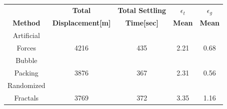 \begin{center}
 \label{perf_multiple} 
\begin{tabular}{|c|c|c|c|c|}
					
\hline
\textbf{} & \textbf{Total}  & \textbf{Total Settling} & \textbf{$\epsilon_t$} & \textbf{$\epsilon_g$} \\ \textbf{Method} & \textbf{Displacement[m]} & \textbf{Time[sec]}& \textbf{Mean} & \textbf{Mean} \\
\hline
Artificial&  &  &  & \\
 Forces & 4216 & 435& 2.21 & 0.68\\
 \hline
 Bubble&  &  &  & \\
 Packing &3876 &367 &2.31 & 0.56\\
\hline
 Randomized&  &  &  & \\
 Fractals &3769 &372 &3.35 & 1.16\\
\hline
\end{tabular}
\end{center}